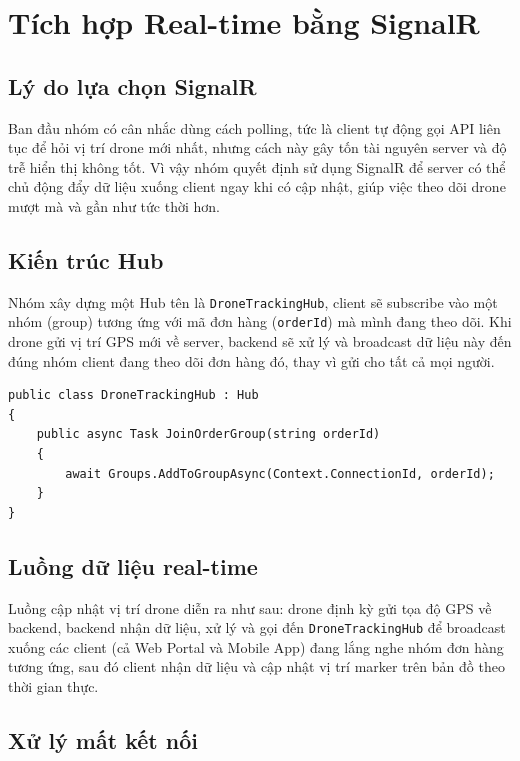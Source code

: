 \section{Tích hợp Real-time bằng SignalR}

\subsection{Lý do lựa chọn SignalR}

Ban đầu nhóm có cân nhắc dùng cách polling, tức là client tự động gọi API liên tục để hỏi vị trí drone mới nhất, nhưng cách này gây tốn tài nguyên server và độ trễ hiển thị không tốt. Vì vậy nhóm quyết định sử dụng SignalR để server có thể chủ động đẩy dữ liệu xuống client ngay khi có cập nhật, giúp việc theo dõi drone mượt mà và gần như tức thời hơn.

\subsection{Kiến trúc Hub}

Nhóm xây dựng một Hub tên là \texttt{DroneTrackingHub}, client sẽ subscribe vào một nhóm (group) tương ứng với mã đơn hàng (\texttt{orderId}) mà mình đang theo dõi. Khi drone gửi vị trí GPS mới về server, backend sẽ xử lý và broadcast dữ liệu này đến đúng nhóm client đang theo dõi đơn hàng đó, thay vì gửi cho tất cả mọi người.

\begin{verbatim}
public class DroneTrackingHub : Hub
{
    public async Task JoinOrderGroup(string orderId)
    {
        await Groups.AddToGroupAsync(Context.ConnectionId, orderId);
    }
}
\end{verbatim}

\subsection{Luồng dữ liệu real-time}

Luồng cập nhật vị trí drone diễn ra như sau: drone định kỳ gửi tọa độ GPS về backend, backend nhận dữ liệu, xử lý và gọi đến \texttt{DroneTrackingHub} để broadcast xuống các client (cả Web Portal và Mobile App) đang lắng nghe nhóm đơn hàng tương ứng, sau đó client nhận dữ liệu và cập nhật vị trí marker trên bản đồ theo thời gian thực.

\subsection{Xử lý mất kết nối}

